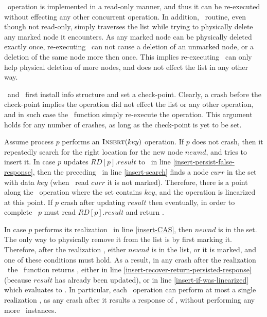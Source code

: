 \find\ operation is implemented in a read-only manner, and thus it can be re-executed without effecting any other concurrent operation.
In addition, \search\ routine, even though not read-only, simply traverses the list 
while trying to physically delete any marked node it encounters. As any marked node can be physically deleted exactly once, re-executing \search\ can not cause a deletion of an unmarked node, or a deletion of the same node more then once. This implies re-executing \search\ can only help physical deletion of more nodes, and does not effect the list in any other way.

\insertlst\ and \delete\ first install info structure and set a check-point. Clearly, a crash before the check-point implies the operation did not effect the list or any other operation, and in such case the \recover\ function simply re-execute the operation. This argument holds for any number of crashes, as long as the check-point is yet to be set.

Assume process $p$ performs an $\mbox{\sc Insert}(key)$ operation. If $p$ does not crash, then it repeatedly search for the right location for the new node $newnd$, 
and tries to insert it.
In case $p$ updates $RD[p].result$ to \False\ in line \ref{insert-persist-false-response}, then the preceding \search\ in line \ref{insert-search} finds a node $curr$ in the set with data $key$ (when \search\ read $curr$ it is not marked). Therefore, there is a point along the \insertlst\ operation where the set contains $key$, and the operation is linearized at this point. If $p$ crash after updating $result$ then eventually, in order to complete \insertrecover\ $p$ must read $RD[p].result$ and return \False.

In case $p$ performs its realization \CAS\ in line \ref{insert-CAS}, then $newnd$ is in the set. The only way to physically remove it from the list is by first marking it. Therefore, after the realization \CAS, either $newnd$ is in the list, or it is marked, and one of these conditions must hold. As a result, in any crash after the realization \CAS\ the \insertrecover\ function returns \True, either in line \ref{insert-recover-return-persisted-response} (because $result$ has already been updated), or in line \ref{insert-if-was-linearized} which evaluates to \True. In particular, each \insertlst\ operation can perform at most a single realization \CAS, as any crash after it results a response of \True, without performing any more \CAS\ instances.

